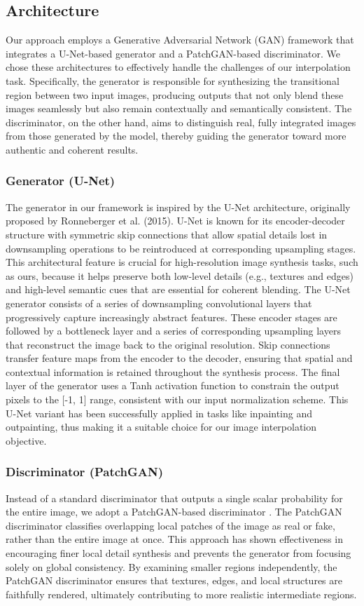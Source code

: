\documentclass[sigconf]{acmart}
\begin{document}
\subsection*{Architecture}
Our approach employs a Generative Adversarial Network (GAN) framework that integrates a U-Net-based generator and a PatchGAN-based discriminator. We chose these architectures to effectively handle the challenges of our interpolation task. Specifically, the generator is responsible for synthesizing the transitional region between two input images, producing outputs that not only blend these images seamlessly but also remain contextually and semantically consistent. The discriminator, on the other hand, aims to distinguish real, fully integrated images from those generated by the model, thereby guiding the generator toward more authentic and coherent results.

\subsubsection*{Generator (U-Net)}
The generator in our framework is inspired by the U-Net architecture, originally proposed by Ronneberger et al. (2015). U-Net is known for its encoder-decoder structure with symmetric skip connections that allow spatial details lost in downsampling operations to be reintroduced at corresponding upsampling stages. This architectural feature is crucial for high-resolution image synthesis tasks, such as ours, because it helps preserve both low-level details (e.g., textures and edges) and high-level semantic cues that are essential for coherent blending. The U-Net generator consists of a series of downsampling convolutional layers that progressively capture increasingly abstract features. These encoder stages are followed by a bottleneck layer and a series of corresponding upsampling layers that reconstruct the image back to the original resolution. Skip connections transfer feature maps from the encoder to the decoder, ensuring that spatial and contextual information is retained throughout the synthesis process. The final layer of the generator uses a Tanh activation function to constrain the output pixels to the [-1, 1] range, consistent with our input normalization scheme. This U-Net variant has been successfully applied in tasks like inpainting and outpainting, thus making it a suitable choice for our image interpolation objective.

\subsubsection*{Discriminator (PatchGAN)}
Instead of a standard discriminator that outputs a single scalar probability for the entire image, we adopt a PatchGAN-based discriminator \cite{Isola2017}. The PatchGAN discriminator classifies overlapping local patches of the image as real or fake, rather than the entire image at once. This approach has shown effectiveness in encouraging finer local detail synthesis and prevents the generator from focusing solely on global consistency. By examining smaller regions independently, the PatchGAN discriminator ensures that textures, edges, and local structures are faithfully rendered, ultimately contributing to more realistic intermediate regions.
\end{document}
